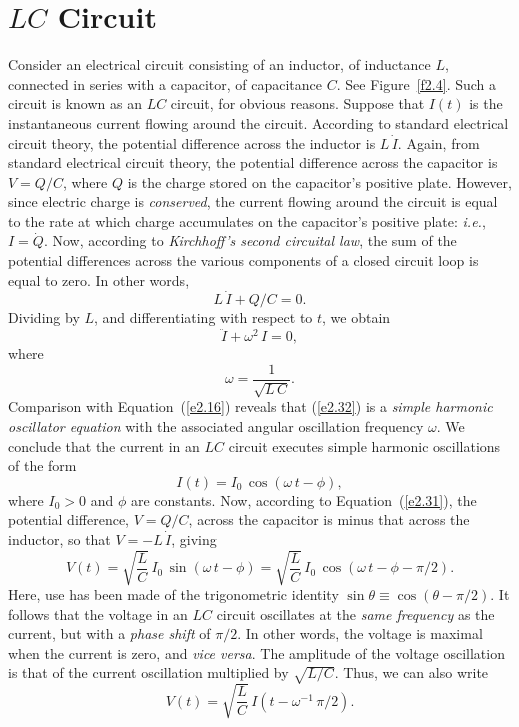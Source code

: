 \section{$LC$ Circuit}\label{slc}
Consider an electrical circuit consisting of an inductor, of inductance $L$, connected
in series with a capacitor, of capacitance $C$. See Figure~\ref{f2.4}. Such
a circuit is known as an $LC$ circuit, for obvious reasons. Suppose that
$I(t)$ is the instantaneous current flowing around the circuit. 
 According to
standard electrical circuit theory, the 
potential difference across the inductor is $L\,\dot{I}$. 
Again,  from standard electrical circuit theory,  the potential difference across the capacitor is $V=Q/C$, where
$Q$ is the charge stored on the capacitor's positive plate. However,
since electric charge is {\em conserved}, 
the current flowing around the circuit is equal to the rate at which charge accumulates on the capacitor's 
 positive plate: {\em i.e.}, $I = \dot{Q}$. 
 Now, according to
{\em Kirchhoff's second circuital law}, the sum of the potential differences across the
various components of a closed circuit loop is equal to zero. In other words,
\begin{equation}\label{e2.31}
 L\,\dot{I}+Q/C = 0.
\end{equation}
Dividing by $L$, and differentiating with respect to $t$, we obtain
\begin{equation}\label{e2.32}
\ddot{I} +  \omega^2\,I = 0,
\end{equation}
where
\begin{equation}\label{e2.33}
\omega = \frac{1}{\sqrt{L\,C}}.
\end{equation}
Comparison with Equation~(\ref{e2.16}) reveals that (\ref{e2.32}) is a {\em simple harmonic oscillator equation}\/ with the associated angular oscillation frequency $\omega$. 
We conclude that the current in an $LC$ circuit executes simple harmonic oscillations of the form
\begin{equation}\label{e2.34}
I(t) = I_0\,\cos(\omega\,t-\phi),
\end{equation}
where $I_0>0$ and $\phi$ are constants. 
Now, according to Equation~(\ref{e2.31}), the potential difference, $V=Q/C$,  across the capacitor is minus that across the inductor, so that $V= -L\,\dot{I}$, giving
\begin{equation}\label{e2.35}
V(t) = \sqrt{\frac{L}{C}}\,I_0\,\sin (\omega\,t-\phi) = \sqrt{\frac{L}{C}}\,I_0\,\cos(\omega\,t-\phi-\pi/2).
\end{equation}
Here, use has been made of the trigonometric identity $\sin\theta\equiv \cos(\theta-\pi/2)$. 
It follows that the voltage in an $LC$ circuit  oscillates at the {\em same
frequency}\/ as the current, but with a {\em phase shift}\/ of $\pi/2$. In other words, the
voltage is maximal when the current is zero, and {\em vice versa}. 
The amplitude of the voltage oscillation is that of the current oscillation
multiplied by $\sqrt{L/C}$. Thus, we can also write
\begin{equation}\label{e2.36}
V(t) = \sqrt{\frac{L}{C}}\,I(t-\omega^{-1}\,\pi/2).
\end{equation}

